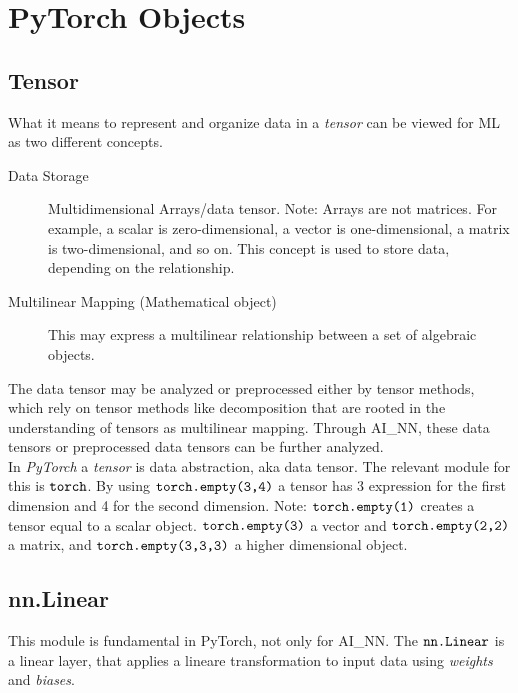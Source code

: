 \section{PyTorch Objects}
\subsection{Tensor}

What it means to represent and organize data in a \textit{tensor} can be viewed for \gls{ML} as two different concepts.
\begin{description}
	\item[Data Storage] Multidimensional Arrays/data tensor. Note: Arrays are not matrices. For example, a scalar is zero-dimensional, a vector is one-dimensional, a matrix is two-dimensional, and so on. This concept is used to store data, depending on the relationship.
	\item[Multilinear Mapping (Mathematical object)] This may express a multilinear relationship between a set of algebraic objects.
\end{description}
The data tensor may be analyzed or preprocessed either by tensor methods, which rely on tensor methods like decomposition that are rooted in the understanding of tensors as multilinear mapping. Through \gls{AI_NN}, these data tensors or preprocessed data tensors can be further analyzed.\\

In \textit{PyTorch} a \textit{tensor} is data abstraction, aka data tensor. The relevant module for this is $\verb|torch|$. By using $\verb|torch.empty(3,4)|$ a tensor has 3 expression for the first dimension and 4 for the second dimension. Note: $\verb|torch.empty(1)| $ creates a tensor equal to a scalar object. $\verb|torch.empty(3)|$  a vector and $\verb|torch.empty(2,2)|$ a matrix, and $\verb|torch.empty(3,3,3)|$ a higher dimensional object.


\subsection{nn.Linear}

This module is fundamental in PyTorch, not only for \gls{AI_NN}. The $\verb|nn.Linear|$ is a linear layer, that applies a lineare transformation to input data using \textit{weights} and \textit{biases}.\\

